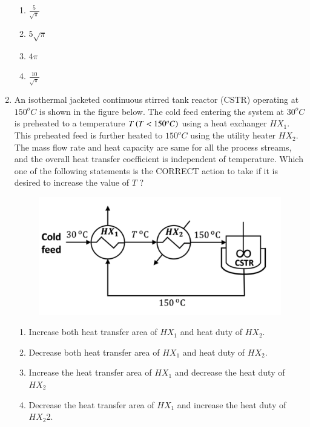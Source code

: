 \documentclass[journal,12pt,onecolumn]{IEEEtran}
\theoremstyle{remark}
\begin{document}
\begin{enumerate}
\hfill{}
\begin{enumerate}
    \item $\frac{5}{\sqrt{\pi}}$
    \item $5\sqrt{\pi}$
    \item $4\pi$
    \item $\frac{10}{\sqrt{\pi}}$
\end{enumerate}

    \item An isothermal jacketed continuous stirred tank reactor (CSTR) operating at $150^{o}C$ is shown in the figure below. The cold feed entering the system at $30^oC$ is preheated to a temperature $T\left(T < 150^oC\right)$ using a heat exchanger $HX_1$. This preheated feed is further heated to $150^oC$ using the utility heater $HX_2$. The mass flow rate and heat capacity are same for all the process streams, and the overall heat transfer coefficient is independent of temperature. Which one of the following statements is the CORRECT action to take if it is desired to increase the value of $T$ ?

\hfill{}
\begin{figure}[H]
    \centering
    \includegraphics[width=0.8\columnwidth]{figs/27.png}
    \caption{}
    \label{fig:27}
\end{figure}

\begin{enumerate}
    \item Increase both heat transfer area of $HX_1$ and heat duty of $HX_2$.
    \item Decrease both heat transfer area of $HX_1$ and heat duty of $HX_2$.
    \item Increase the heat transfer area of $HX_1$ and decrease the heat duty of $HX_2$
    \item Decrease the heat transfer area of $HX_1$ and increase the heat duty of $HX_2$2.
\end{enumerate}


\end{enumerate}
\end{document}
